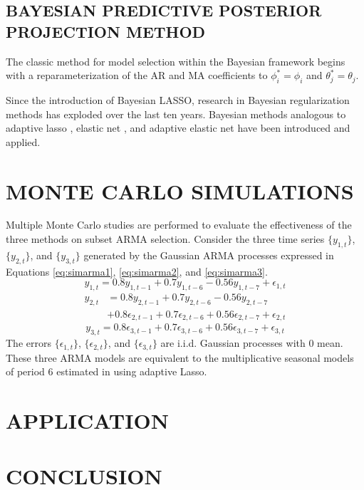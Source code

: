 \subsection{BAYESIAN PREDICTIVE POSTERIOR PROJECTION METHOD}
The classic method for model selection within the Bayesian framework begins with a reparameterization of the AR and MA coefficients to $\phi_i^*=\phi_i$ and $\theta_j^*=\theta_j$.

Since the introduction of Bayesian LASSO, research in Bayesian regularization methods has exploded over the last ten years. Bayesian methods analogous to adaptive lasso \citep{Leng2014}, elastic net \citep{Li2010a}, and adaptive elastic net \citep{Stankiewicz2015} have been introduced and applied. \cite{Polson2010}





\section{MONTE CARLO SIMULATIONS}
Multiple Monte Carlo studies are performed to evaluate the effectiveness of the three methods on subset ARMA selection. Consider the three time series $\{y_{1,t}\}$, $\{y_{2,t}\}$, and $\{y_{3,t}\}$ generated by the Gaussian ARMA processes expressed in Equations \ref{eq:simarma1}, \ref{eq:simarma2}, and \ref{eq:simarma3}.
\begin{equation}
	\label{eq:simarma1}
	y_{1,t}=0.8y_{1,t-1}+0.7y_{1,t-6}-0.56y_{1,t-7}+\epsilon_{1,t}
\end{equation}
\begin{equation}
	\begin{split}
	\label{eq:simarma2}
	y_{2,t}&=0.8y_{2,t-1}+0.7y_{2,t-6}-0.56y_{2,t-7}\\
	&+0.8\epsilon_{2,t-1}+0.7\epsilon_{2,t-6}+0.56\epsilon_{2,t-7}+\epsilon_{2,t}
	\end{split}
\end{equation}
\begin{equation}
	\label{eq:simarma3}
	y_{3,t}=0.8\epsilon_{3,t-1}+0.7\epsilon_{3,t-6}+0.56\epsilon_{3,t-7}+\epsilon_{3,t}
\end{equation}
The errors $\{\epsilon_{1,t}\}$, $\{\epsilon_{2,t}\}$, and $\{\epsilon_{3,t}\}$ are i.i.d. Gaussian processes with $0$ mean. These three ARMA models are equivalent to the multiplicative seasonal models of period 6 estimated in \cite{Chen2011} using adaptive Lasso. 





\section{APPLICATION}






\section{CONCLUSION}
